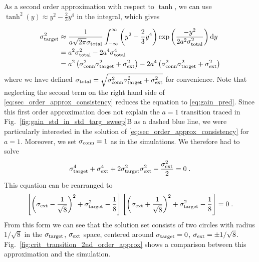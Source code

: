 \documentclass[10pt,a4paper]{article}
\begin{document}
As a second order approximation with respect to $\tanh$, we can use $\tanh^2(y) \approx y^2 - \frac{2}{3} y^4$ in the integral, which gives

\begin{align}
\sigma_{\rm target}^2 &\approx \frac{1}{a\sqrt{2 \pi}\sigma_{\rm total}}\int_{-\infty}^{\infty}\left( y^2 - \frac{2}{3}y^4\right)\exp\left( \frac{-y^2}{2a^2\sigma_{\rm total}^2}\right) \mathrm{d}y \\
&= a^2\sigma_{\rm total}^2 - 2a^4\sigma_{\rm total}^4 \\
&= a^2\left( \sigma^2_{\rm conn}\sigma^2_{\rm target} + \sigma^2_{\rm ext} \right) - 2a^4 \left( \sigma^2_{\rm conn}\sigma^2_{\rm target} + \sigma^2_{\rm ext} \right) \label{eq:sec_order_approx_consistency}
\end{align}
where we have defined $\sigma_{\rm total} = \sqrt{\sigma^2_{\rm conn}\sigma^2_{\rm target} + \sigma^2_{\rm ext}}$ for convenience. Note that neglecting the second term on the right hand side of \eqref{eq:sec_order_approx_consistency} reduces the equation to \eqref{eq:gain_pred}. Since this first order approximation does not explain the $a=1$ transition traced in Fig.~\ref{fig:gain_std_in_std_targ_sweep}B as a dashed blue line, we were particularly interested in the solution of \eqref{eq:sec_order_approx_consistency} for $a=1$. Moreover, we set $\sigma_{\rm conn}=1$ as in the simulations. We therefore had to solve
\begin{equation}
	\sigma_{\rm target}^4 + \sigma_{\rm ext}^4 + 2\sigma_{\rm target}^2\sigma_{\rm ext}^2 - \frac{\sigma_{\rm ext}^2}{2} = 0 \; .
\end{equation}
This equation can be rearranged to
\begin{equation}
	\left[\left(\sigma_{\rm ext} - \frac{1}{\sqrt{8}}\right)^2 + \sigma_{\rm target}^2 - \frac{1}{8}\right]\left[\left(\sigma_{\rm ext} + \frac{1}{\sqrt{8}}\right)^2 + \sigma_{\rm target}^2 - \frac{1}{8}\right] = 0 \; . \label{eq:circles_solution_form}
\end{equation}
From this form we can see that the solution set consists of two circles with radius $1/\sqrt{8}$ in the $\sigma_{\rm target}$, $\sigma_{\rm ext}$ space, centered around $\sigma_{\rm target} = 0$, $\sigma_{\rm ext} = \pm 1/\sqrt{8}$. Fig.~\ref{fig:crit_transition_2nd_order_approx} shows a comparison between this approximation and the simulation.
\end{document}
